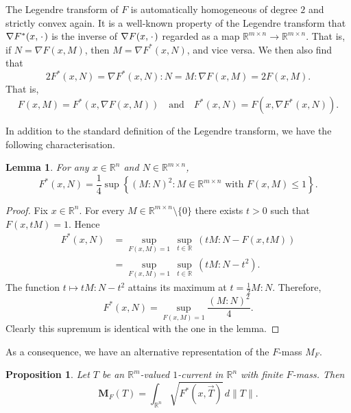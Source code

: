 \documentclass[a4paper]{article}
\newcommand{\R}{\mathbb{R}}
\newcommand{\M}{\mathbf{M}}
\newcommand{\grad}{\nabla}
\newcommand{\blank}{{\mkern 2mu\cdot\mkern 2mu}}
\newcommand{\set}[2]{\left\{ #1 \colon #2 \right\}}
\newtheorem{lemma}[theorem]{Lemma}
\newtheorem{proposition}[theorem]{Proposition}
\theoremstyle{definition}
\theoremstyle{remark}
\begin{document}
The Legendre transform of $F$ is automatically homogeneous of degree $2$
and strictly convex again.
It is a well-known property of the Legendre transform that $\grad F^*(x, \blank)$
is the inverse of $\grad F(x, \blank)$ regarded as a map
$\R^{m \times n} \to \R^{m \times n}$. That is, if $N = \grad F(x, M)$,
then $M = \grad F^*(x, N)$, and vice versa. We then also find that
\[
2F^*(x, N) = \grad F^*(x, N) : N = M : \grad F(x, M) = 2F(x, M).
\]
That is,
\[
F(x, M) = F^*(x, \grad F(x, M)) \quad \text{and} \quad F^*(x, N) = F(x, \grad F^*(x, N)).
\]

In addition to the standard definition of the Legendre transform, we have
the following characterisation.

\begin{lemma} \label{lem:Legendre-transform}
For any $x \in \R^n$ and $N \in \R^{m \times n}$,
\[
F^*(x, N) = \frac{1}{4} \sup\set{(M : N)^2}{M \in \R^{m \times n} \text{ with } F(x, M) \le 1}.
\]
\end{lemma}

\begin{proof}
Fix $x \in \R^n$. For every $M \in \R^{m \times n} \setminus \{0\}$ there
exists $t > 0$ such that $F(x, tM) = 1$. Hence
\[
\begin{split}
F^*(x, N) & = \sup_{F(x, M) = 1} \, \sup_{t \in \R} \ (tM : N - F(x, tM)) \\
& = \sup_{F(x, M) = 1} \, \sup_{t \in \R} \ (tM : N - t^2).
\end{split}
\]
The function $t \mapsto tM : N - t^2$ attains its maximum at
$t = \frac{1}{2} M : N$. Therefore,
\[
F^*(x, N) = \sup_{F(x, M) = 1} \frac{(M : N)^2}{4}.
\]
Clearly this supremum is identical with the one in the lemma.
\end{proof}

As a consequence, we have an alternative representation of the $F$-mass $M_F$.

\begin{proposition} \label{prp:F-mass}
Let $T$ be an $\R^m$-valued $1$-current in $\R^n$ with finite $F$-mass. Then
\[
\M_F(T) = \int_{\R^n} \sqrt{F^*(x, \vec{T})} \, d\|T\|.
\]
\end{proposition}
\end{document}
